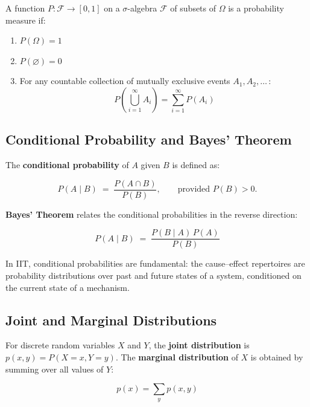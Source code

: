 \documentclass[11pt,a4paper]{report}
\begin{document}
\begin{definitionbox}
A function $P : \mathcal{F} \to [0,1]$ on a $\sigma$-algebra $\mathcal{F}$ of subsets of $\Omega$ is a probability measure if:
\begin{enumerate}[label=(\roman*), leftmargin=2em]
  \item $P(\Omega) = 1$
  \item $P(\varnothing) = 0$
  \item For any countable collection of mutually exclusive events $A_1, A_2, \ldots$\,:
    \[
      P\!\left(\bigcup_{i=1}^{\infty} A_i\right) = \sum_{i=1}^{\infty} P(A_i)
    \]
\end{enumerate}
\end{definitionbox}

\subsection{Conditional Probability and Bayes' Theorem}

The \textbf{conditional probability} of $A$ given $B$ is defined as:
\begin{mathbox}
\vspace{-8pt}
\[
  P(A \mid B) \;=\; \frac{P(A \cap B)}{P(B)}, \qquad \text{provided } P(B) > 0.
\]
\vspace{-10pt}
\end{mathbox}

\textbf{Bayes' Theorem} relates the conditional probabilities in the reverse direction:
\begin{mathbox}
\vspace{-8pt}
\[
  P(A \mid B) \;=\; \frac{P(B \mid A)\, P(A)}{P(B)}
\]
\vspace{-10pt}
\end{mathbox}

In IIT, conditional probabilities are fundamental: the cause--effect repertoires are probability distributions over past and future states of a system, conditioned on the current state of a mechanism.

\subsection{Joint and Marginal Distributions}

For discrete random variables $X$ and $Y$, the \textbf{joint distribution} is $p(x, y) = P(X{=}x, Y{=}y)$. The \textbf{marginal distribution} of $X$ is obtained by summing over all values of $Y$:
\begin{mathbox}
\vspace{-8pt}
\[
  p(x) = \sum_{y} p(x, y)
\]
\vspace{-10pt}
\end{mathbox}
\end{document}
